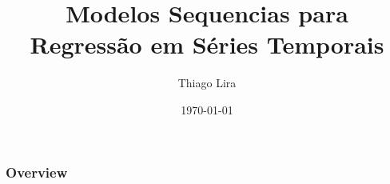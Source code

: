 \documentclass{beamer}
\title{Modelos Sequencias para Regressão em Séries Temporais} %
\author{Thiago Lira} %
\institute[IME-USP] %
{
Instituto de Matemática e Estatística - USP \\ %
\medskip
\textit{thlira15@gmail.com} %
}
\date{\today} %
\begin{document}
\begin{frame}
\titlepage %
\end{frame}

\begin{frame}
\frametitle{Overview} %
\tableofcontents %
\end{frame}



































\end{document}
